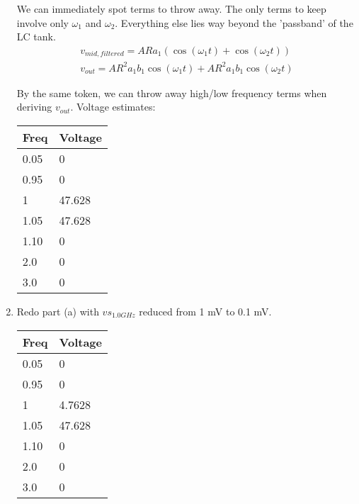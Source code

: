 \begin{enumerate}[label=(\alph*)]
    We can immediately spot terms to throw away. The only terms to keep involve only $\omega_1$ and $\omega_2$. Everything else
        lies way beyond the 'passband' of the LC tank.
    \begin{align*}
        v_{mid,filtered} = A R a_{1} (\cos{\left (\omega_1 t \right )} + \cos{\left (\omega_2 t \right )}) \\
        v_{out} = A R^{2} a_{1} b_{1} \cos{\left (\omega_1 t \right )} + A R^{2} a_{1} b_{1} \cos{\left (\omega_2 t \right )}
    \end{align*}

    By the same token, we can throw away high/low frequency terms when deriving $v_{out}$. Voltage estimates:

    \begin{center}
    \begin{tabular}{| l | l |} \hline
        Freq & Voltage \\ \hline
        0.05 & 0 \\ \hline
        0.95 & 0 \\ \hline
        1 & 47.628 \\ \hline
        1.05 & 47.628 \\ \hline
        1.10 & 0 \\ \hline
        2.0 & 0 \\ \hline
        3.0 & 0 \\ \hline
    \end{tabular}
    \end{center}

    \item {\color{blue} Redo part (a) with $vs_{1.0GHz}$ reduced from 1 mV to 0.1 mV.}

    \begin{center}
    \begin{tabular}{| l | l |} \hline
        Freq & Voltage \\ \hline
        0.05 & 0 \\ \hline
        0.95 & 0 \\ \hline
        1 & 4.7628 \\ \hline
        1.05 & 47.628 \\ \hline
        1.10 & 0 \\ \hline
        2.0 & 0 \\ \hline
        3.0 & 0 \\ \hline
    \end{tabular}
    \end{center}


\end{enumerate}
